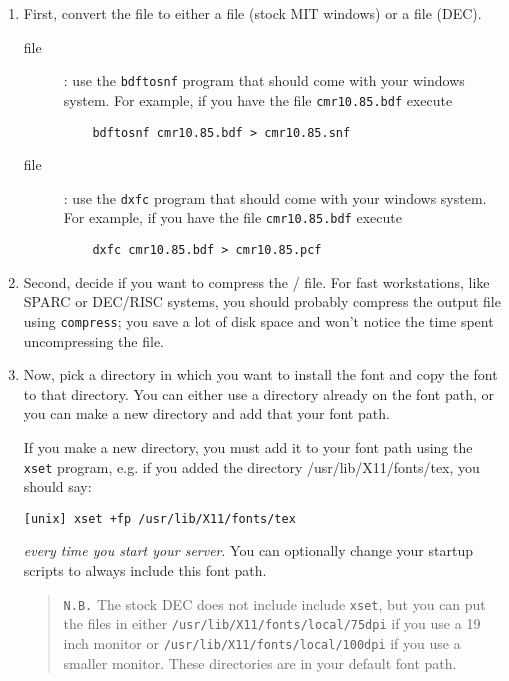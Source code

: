 \begin{enumerate}
  
\item First, convert the {\BDF} file to either a {\SNF} file
	(stock MIT {\X} windows) or a {\PCF} file (DEC).
%
\begin{description}
\item[{\SNF} file]: use the {\tt bdftosnf} program that should come with
	your {\X} windows system. For example, if you have the file
	{\tt cmr10.85.bdf}
	execute
\begin{verbatim}
    bdftosnf cmr10.85.bdf > cmr10.85.snf
\end{verbatim}

\item[{\PCF} file]: use the {\tt dxfc} program that should come with
	your {\X} windows system. For example, if you have the file
	{\tt cmr10.85.bdf}
	execute
\begin{verbatim}
    dxfc cmr10.85.bdf > cmr10.85.pcf
\end{verbatim}

\end{description}

\item Second, decide if you want to compress the {\SNF}/{\PCF} file.
For fast workstations, like SPARC or DEC/RISC systems, you should probably
compress the output file using {\tt compress}; you save a lot of disk space
and won't notice the time spent uncompressing the file.

\item	Now, pick a directory in which you want to install the font
	and copy the font to that directory.
	You can either use a directory already on the {\X} font path,
	or you can make a new directory and add that your font path.

	If you make a new directory, you must add it to your font path using
	the {\tt xset} program, e.g. if you added the directory
	/usr/lib/X11/fonts/tex, you should say:
\begin{verbatim}
[unix] xset +fp /usr/lib/X11/fonts/tex
\end{verbatim}
	{\em every time you start your {\X} server}. You can optionally
	change your {\X} startup scripts to always include this font path.

	\begin{quotation}\noindent
	 {\tt N.B.} The stock DEC {\X} does not include include {\tt xset},
	but you can put the {\PCF} files in either
\verb|/usr/lib/X11/fonts/local/75dpi| if you use a 19 inch monitor
or 
\verb|/usr/lib/X11/fonts/local/100dpi| if you use a smaller monitor.
These directories are in your default font path.
	\end{quotation}


\end{enumerate}
